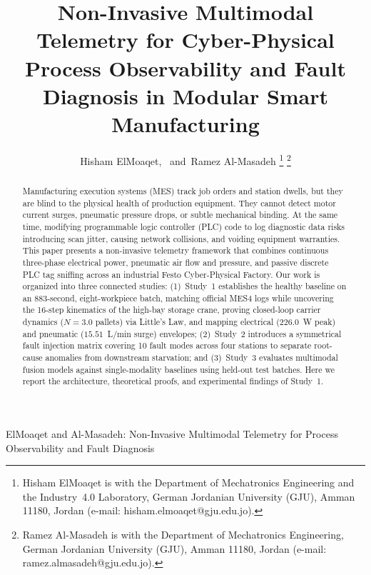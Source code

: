 \documentclass[journal]{IEEEtran}
\begin{document}
\title{Non-Invasive Multimodal Telemetry for Cyber-Physical Process Observability and Fault Diagnosis in Modular Smart Manufacturing}

\author{Hisham ElMoaqet,~
        and~Ramez Al-Masadeh%
\thanks{Hisham ElMoaqet is with the Department of Mechatronics Engineering and the Industry~4.0 Laboratory, German Jordanian University (GJU), Amman 11180, Jordan (e-mail: hisham.elmoaqet@gju.edu.jo).}%
\thanks{Ramez Al-Masadeh is with the Department of Mechatronics Engineering, German Jordanian University (GJU), Amman 11180, Jordan (e-mail: ramez.almasadeh@gju.edu.jo).}%
}

%
{ElMoaqet and Al-Masadeh: Non-Invasive Multimodal Telemetry for Process Observability and Fault Diagnosis}

\maketitle

\begin{abstract}
Manufacturing execution systems (MES) track job orders and station dwells, but they are blind to the physical health of production equipment. They cannot detect motor current surges, pneumatic pressure drops, or subtle mechanical binding. At the same time, modifying programmable logic controller (PLC) code to log diagnostic data risks introducing scan jitter, causing network collisions, and voiding equipment warranties. This paper presents a non-invasive telemetry framework that combines continuous three-phase electrical power, pneumatic air flow and pressure, and passive discrete PLC tag sniffing across an industrial Festo Cyber-Physical Factory. Our work is organized into three connected studies: (1)~Study~1 establishes the healthy baseline on an 883-second, eight-workpiece batch, matching official MES4 logs while uncovering the 16-step kinematics of the high-bay storage crane, proving closed-loop carrier dynamics ($N = 3.0$ pallets) via Little's Law, and mapping electrical ($226.0$~W peak) and pneumatic ($15.51$~L/min surge) envelopes; (2)~Study~2 introduces a symmetrical fault injection matrix covering 10 fault modes across four stations to separate root-cause anomalies from downstream starvation; and (3)~Study~3 evaluates multimodal fusion models against single-modality baselines using held-out test batches. Here we report the architecture, theoretical proofs, and experimental findings of Study~1.
\end{abstract}
\end{document}
